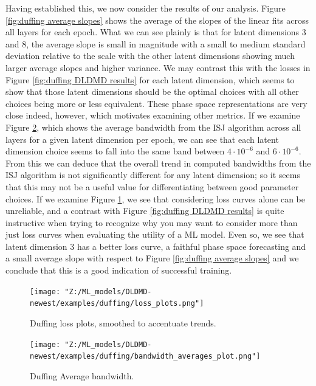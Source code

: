 Having established this, we now consider the results of our analysis.
Figure \ref{fig:duffing average slopes} shows the average of the slopes of the linear fits across 
all layers for each epoch.  What we can see plainly is that for latent dimensions 3 and 8, 
the average slope is small in magnitude with a small to medium standard deviation relative to the scale 
with the other latent dimensions showing much larger average slopes and higher variance. We may contrast this 
with the losses in Figure \ref{fig:duffing DLDMD results} for each latent 
dimension, which seems to show that those latent dimensions should be the optimal choices with all other 
choices being more or less equivalent. These phase space representations are very close indeed, however, 
which motivates examining other metrics. If we examine Figure \ref{fig:duffing average bandwidth}, which shows the average 
bandwidth from the ISJ algorithm across all layers for a given latent dimension per epoch, we can see 
that each latent dimension choice seems to fall into the same band between $4\cdot10^{-6}$ and 
$6\cdot10^{-6}$. From this we can deduce that the overall trend in computed bandwidths from the ISJ 
algorithm is not significantly different for any latent dimension; so it seems that this may not be a 
useful value for differentiating between good parameter choices. If we examine Figure \ref{fig:duffing losses},
we see that considering loss curves alone can be unreliable, and a contrast with Figure \ref{fig:duffing DLDMD results} 
is quite instructive when trying to recognize why you may want to consider more than just loss curves when 
evaluating the utility of a ML model. Even so, we see that latent dimension 3 has a better loss curve, 
a faithful phase space forecasting and a small average slope with respect to Figure \ref{fig:duffing average slopes}
and we conclude that this is a good indication of successful training.

\begin{figure}[!ht]
    \centering
    \begin{minipage}{\textwidth}
        \texttt{[image: "Z:/ML\_models/DLDMD-newest/examples/duffing/loss\_plots.png"]} 
    \end{minipage}%
    \caption{Duffing loss plots, smoothed to accentuate trends.}
    \label{fig:duffing losses}
\end{figure}

\begin{figure}[!ht]
    \centering
    \begin{minipage}{\textwidth}
        \texttt{[image: "Z:/ML\_models/DLDMD-newest/examples/duffing/bandwidth\_averages\_plot.png"]} 
    \end{minipage} 
    \caption{Duffing Average bandwidth.}
    \label{fig:duffing average bandwidth}
\end{figure}

